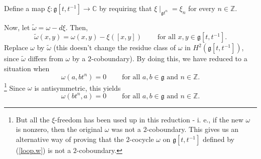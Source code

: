 \documentclass
[numbers=enddot,12pt,final,onecolumn,german,notitlepage]{scrartcl}%
\theoremstyle{definition}
\begin{document}
Define a map $\xi:\mathfrak{g}\left[  t,t^{-1}\right]  \rightarrow\mathbb{C}$
by requiring that $\xi\mid_{\mathfrak{g}t^{n}}=\xi_{n}$ for every
$n\in\mathbb{Z}$.

Now, let $\widetilde{\omega}=\omega-d\xi$. Then,%
\[
\widetilde{\omega}\left(  x,y\right)  =\omega\left(  x,y\right)  -\xi\left(
\left[  x,y\right]  \right)  \ \ \ \ \ \ \ \ \ \ \text{for all }%
x,y\in\mathfrak{g}\left[  t,t^{-1}\right]  .
\]
Replace $\omega$ by $\widetilde{\omega}$ (this doesn't change the residue
class of $\omega$ in $H^{2}\left(  \mathfrak{g}\left[  t,t^{-1}\right]
\right)  $, since $\widetilde{\omega}$ differs from $\omega$ by a
$2$-coboundary). By doing this, we have reduced to a situation when
\[
\omega\left(  a,bt^{n}\right)  =0\ \ \ \ \ \ \ \ \ \ \text{for all }%
a,b\in\mathfrak{g}\text{ and }n\in\mathbb{Z}.
\]
\footnote{But all the $\xi$-freedom has been used up in this reduction - i.
e., if the new $\omega$ is nonzero, then the original $\omega$ was not a
$2$-coboundary. This gives us an alternative way of proving that the
$2$-cocycle $\omega$ on $\mathfrak{g}\left[  t,t^{-1}\right]  $ defined by
(\ref{loop.w}) is not a $2$-coboundary.} Since $\omega$ is antisymmetric, this
yields%
\begin{equation}
\omega\left(  bt^{n},a\right)  =0\ \ \ \ \ \ \ \ \ \ \text{for all }%
a,b\in\mathfrak{g}\text{ and }n\in\mathbb{Z}. \label{thm.H^2(gtt).pf.1}%
\end{equation}
\end{document}
